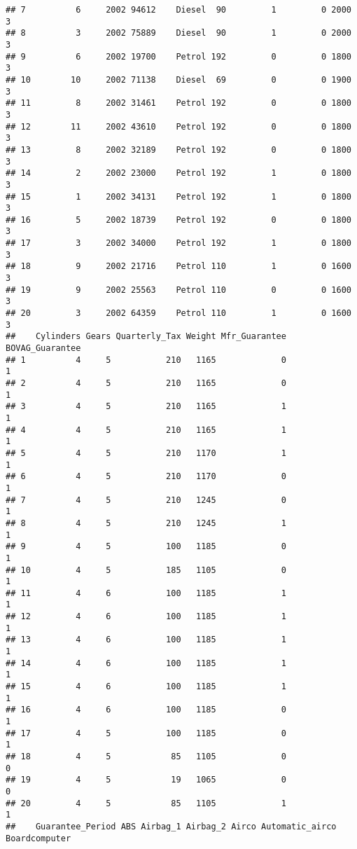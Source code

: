 \documentclass[
]{article}
\begin{document}
\begin{verbatim}
## 7          6     2002 94612    Diesel  90         1         0 2000     3
## 8          3     2002 75889    Diesel  90         1         0 2000     3
## 9          6     2002 19700    Petrol 192         0         0 1800     3
## 10        10     2002 71138    Diesel  69         0         0 1900     3
## 11         8     2002 31461    Petrol 192         0         0 1800     3
## 12        11     2002 43610    Petrol 192         0         0 1800     3
## 13         8     2002 32189    Petrol 192         0         0 1800     3
## 14         2     2002 23000    Petrol 192         1         0 1800     3
## 15         1     2002 34131    Petrol 192         1         0 1800     3
## 16         5     2002 18739    Petrol 192         0         0 1800     3
## 17         3     2002 34000    Petrol 192         1         0 1800     3
## 18         9     2002 21716    Petrol 110         1         0 1600     3
## 19         9     2002 25563    Petrol 110         0         0 1600     3
## 20         3     2002 64359    Petrol 110         1         0 1600     3
##    Cylinders Gears Quarterly_Tax Weight Mfr_Guarantee BOVAG_Guarantee
## 1          4     5           210   1165             0               1
## 2          4     5           210   1165             0               1
## 3          4     5           210   1165             1               1
## 4          4     5           210   1165             1               1
## 5          4     5           210   1170             1               1
## 6          4     5           210   1170             0               1
## 7          4     5           210   1245             0               1
## 8          4     5           210   1245             1               1
## 9          4     5           100   1185             0               1
## 10         4     5           185   1105             0               1
## 11         4     6           100   1185             1               1
## 12         4     6           100   1185             1               1
## 13         4     6           100   1185             1               1
## 14         4     6           100   1185             1               1
## 15         4     6           100   1185             1               1
## 16         4     6           100   1185             0               1
## 17         4     5           100   1185             0               1
## 18         4     5            85   1105             0               0
## 19         4     5            19   1065             0               0
## 20         4     5            85   1105             1               1
##    Guarantee_Period ABS Airbag_1 Airbag_2 Airco Automatic_airco Boardcomputer

\end{verbatim}
\end{document}
